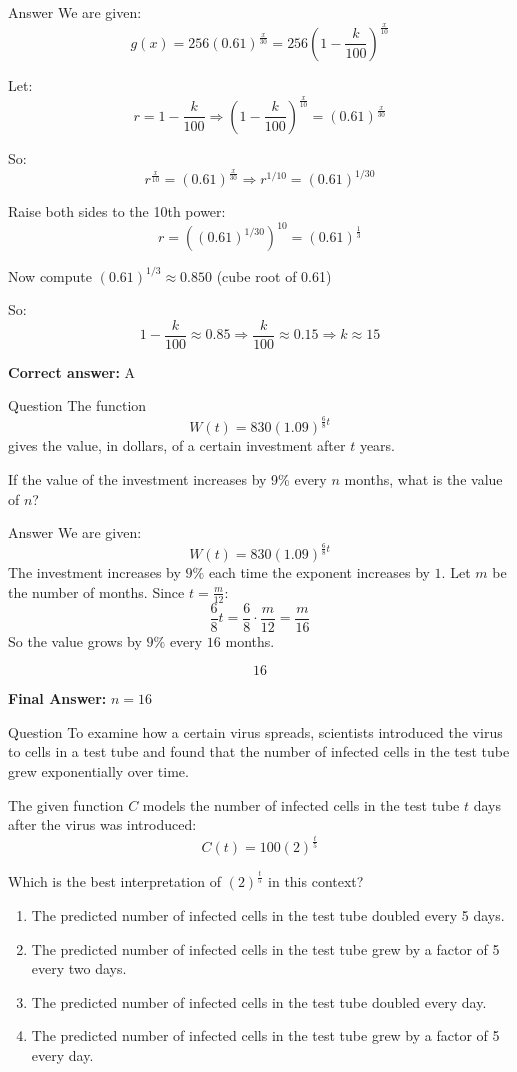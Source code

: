 \documentclass{beamer}
\begin{document}
\begin{frame}{Answer}
\small
We are given:
\[
g(x) = 256(0.61)^{\frac{x}{30}} = 256\left(1 - \frac{k}{100}\right)^{\frac{x}{10}}
\]

Let:
\[
r = 1 - \frac{k}{100} \Rightarrow \left(1 - \frac{k}{100}\right)^{\frac{x}{10}} = (0.61)^{\frac{x}{30}}
\]

So:
\[
r^{\frac{x}{10}} = (0.61)^{\frac{x}{30}} \Rightarrow r^{1/10} = (0.61)^{1/30}
\]

Raise both sides to the 10th power:
\[
r = \left((0.61)^{1/30}\right)^{10} = (0.61)^{\frac{1}{3}}
\]

Now compute $(0.61)^{1/3} \approx 0.850$ (cube root of 0.61)

So:
\[
1 - \frac{k}{100} \approx 0.85 \Rightarrow \frac{k}{100} \approx 0.15 \Rightarrow k \approx 15
\]

\textbf{Correct answer:} A
\end{frame}

\begin{frame}{Question}
The function
\[
W(t) = 830(1.09)^{\frac{6}{8}t}
\]
gives the value, in dollars, of a certain investment after $t$ years. 

If the value of the investment increases by 9\% every $n$ months, what is the value of $n$?
\end{frame}


\begin{frame}{Answer}
We are given:
\[
W(t) = 830(1.09)^{\frac{6}{8}t}
\]
The investment increases by $9\%$ each time the exponent increases by $1$. Let $m$ be the number of months. Since $t = \frac{m}{12}$:
\[
\frac{6}{8}t = \frac{6}{8}\cdot\frac{m}{12} = \frac{m}{16}
\]
So the value grows by $9\%$ every $16$ months.

\[
\boxed{16}
\]

\textbf{Final Answer:} $n = 16$
\end{frame}


\begin{frame}{Question}
To examine how a certain virus spreads, scientists introduced the virus to cells in a test tube and found that the number of infected cells in the test tube grew exponentially over time. 

The given function $C$ models the number of infected cells in the test tube $t$ days after the virus was introduced:
\[
C(t) = 100(2)^{\frac{t}{5}}
\]

Which is the best interpretation of $(2)^{\frac{t}{5}}$ in this context?

\begin{enumerate}
  \item[A)] The predicted number of infected cells in the test tube doubled every 5 days.
  \item[B)] The predicted number of infected cells in the test tube grew by a factor of 5 every two days.
  \item[C)] The predicted number of infected cells in the test tube doubled every day.
  \item[D)] The predicted number of infected cells in the test tube grew by a factor of 5 every day.
\end{enumerate}
\end{frame}
\end{document}
